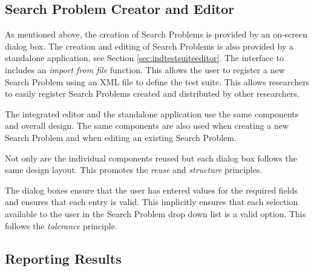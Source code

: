 \subsection{Search Problem Creator and Editor}
\label{sec:guisearchcreateed}
As mentioned above, the creation of Search Problems is provided by an on-screen dialog box.
The creation and editing of Search Problems is also provided by a standalone application, see Section \ref{sec:indtestsuiteeditor}.
The interface to includes an \emph{import from file} function.
This allows the user to register a new Search Problem using an XML file to define the test suite.
This allows researchers to easily register Search Problems created and distributed by other researchers.

The integrated editor and the standalone application use the same components and overall design.
The same components are also used when creating a new Search Problem and when editing an existing Search Problem.

Not only are the individual components reused but each dialog box follows the same design layout.
This promotes the \emph{reuse} and \emph{structure} principles.

The dialog boxes ensure that the user has entered values for the required fields and ensures that each entry is valid.
This implicitly ensures that each selection available to the user in the Search Problem drop down list is a valid option.
This follows the \emph{tolerance} principle.

\subsection{Reporting Results}
\label{sec:repres}

